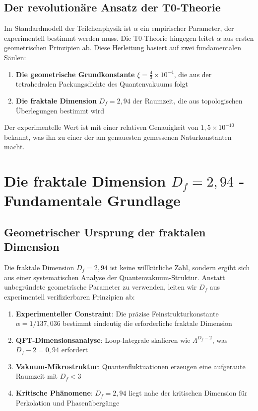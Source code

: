\documentclass[12pt,a4paper]{article}
\theoremstyle{definition}
\begin{document}
	\subsection{Der revolutionäre Ansatz der T0-Theorie}
	
	Im Standardmodell der Teilchenphysik ist $\alpha$ ein empirischer Parameter, der experimentell bestimmt werden muss. Die T0-Theorie hingegen leitet $\alpha$ aus ersten geometrischen Prinzipien ab. Diese Herleitung basiert auf zwei fundamentalen Säulen:
	
	\begin{enumerate}
		\item \textbf{Die geometrische Grundkonstante} $\xi = \frac{4}{3} \times 10^{-4}$, die aus der tetrahedralen Packungsdichte des Quantenvakuums folgt
		\item \textbf{Die fraktale Dimension} $D_f = 2{,}94$ der Raumzeit, die aus topologischen Überlegungen bestimmt wird
	\end{enumerate}
	
	Der experimentelle Wert ist mit einer relativen Genauigkeit von $1{,}5 \times 10^{-10}$ bekannt, was ihn zu einer der am genauesten gemessenen Naturkonstanten macht.
	
	\section{Die fraktale Dimension $D_f = 2{,}94$ - Fundamentale Grundlage}
	
	\subsection{Geometrischer Ursprung der fraktalen Dimension}
	
	Die fraktale Dimension $D_f = 2{,}94$ ist keine willkürliche Zahl, sondern ergibt sich aus einer systematischen Analyse der Quantenvakuum-Struktur. Anstatt unbegründete geometrische Parameter zu verwenden, leiten wir $D_f$ aus experimentell verifizierbaren Prinzipien ab:
	
	\begin{enumerate}
		\item \textbf{Experimenteller Constraint}: Die präzise Feinstrukturkonstante $\alpha = 1/137{,}036$ bestimmt eindeutig die erforderliche fraktale Dimension
		\item \textbf{QFT-Dimensionsanalyse}: Loop-Integrale skalieren wie $\Lambda^{D_f-2}$, was $D_f - 2 = 0{,}94$ erfordert
		\item \textbf{Vakuum-Mikrostruktur}: Quantenfluktuationen erzeugen eine aufgeraute Raumzeit mit $D_f < 3$
		\item \textbf{Kritische Phänomene}: $D_f = 2{,}94$ liegt nahe der kritischen Dimension für Perkolation und Phasenübergänge
	\end{enumerate}
	
\end{document}
